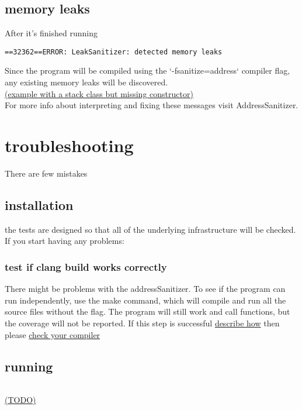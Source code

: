\documentclass{elteikthesis}[2018/06/06]
\begin{document}
\subsection{memory leaks}
\label{sec-2-5-2}
After it's finished running \\
\begin{verbatim}
==32362==ERROR: LeakSanitizer: detected memory leaks
\end{verbatim}
Since the program will be compiled using the `-fsanitize=address` compiler flag, any existing memory leaks will be discovered. \\
\uline{(example with a stack class but missing constructor)} \\
For more info about interpreting and fixing these messages visit AddressSanitizer. \\
\section{troubleshooting}
\label{sec-2-6}
There are few mistakes \\
\subsection{installation}
\label{sec-2-6-1}
the tests are designed so that all of the underlying infrastructure will be checked. If you start having any problems: \\
\subsubsection{test if clang build works correctly}
\label{sec-2-6-1-1}
There might be problems with the addressSanitizer. To see if the program can run independently, use the make command, which will compile and run all the source files without the flag. The program will still work and call functions, but the coverage will not be reported. If this step is successful \uline{describe how} then please \uline{check your compiler} \\
\subsection{running}
\label{sec-2-6-2}
\begin{center}
\begin{tabular}{}
\\
\end{tabular}
\end{center}
\uline{(TODO)} \\
\begin{center}
\begin{tabular}{}
\\
\end{tabular}
\end{center}
\end{document}
